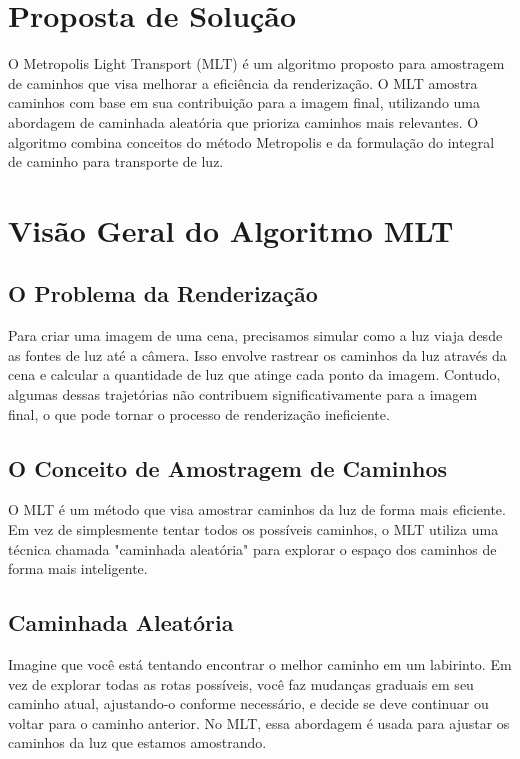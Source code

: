 \documentclass{article}
\begin{document}
\section{Proposta de Solução}
O Metropolis Light Transport (MLT) é um algoritmo proposto para amostragem de caminhos que visa melhorar a eficiência da renderização. O MLT amostra caminhos com base em sua contribuição para a imagem final, utilizando uma abordagem de caminhada aleatória que prioriza caminhos mais relevantes. O algoritmo combina conceitos do método Metropolis e da formulação do integral de caminho para transporte de luz.

\section{Visão Geral do Algoritmo MLT}

\subsection{O Problema da Renderização}

Para criar uma imagem de uma cena, precisamos simular como a luz viaja desde as fontes de luz até a câmera. Isso envolve rastrear os caminhos da luz através da cena e calcular a quantidade de luz que atinge cada ponto da imagem. Contudo, algumas dessas trajetórias não contribuem significativamente para a imagem final, o que pode tornar o processo de renderização ineficiente.

\subsection{O Conceito de Amostragem de Caminhos}

O MLT é um método que visa amostrar caminhos da luz de forma mais eficiente. Em vez de simplesmente tentar todos os possíveis caminhos, o MLT utiliza uma técnica chamada "caminhada aleatória" para explorar o espaço dos caminhos de forma mais inteligente.

\subsection{Caminhada Aleatória}

Imagine que você está tentando encontrar o melhor caminho em um labirinto. Em vez de explorar todas as rotas possíveis, você faz mudanças graduais em seu caminho atual, ajustando-o conforme necessário, e decide se deve continuar ou voltar para o caminho anterior. No MLT, essa abordagem é usada para ajustar os caminhos da luz que estamos amostrando.
\end{document}
